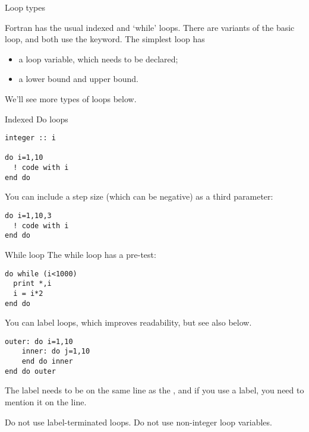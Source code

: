 
 {Loop types}

Fortran has the usual indexed and `while' loops. There are variants of the
basic loop, and both use the  keyword. The simplest loop has
\begin{itemize}
\item a loop variable, which needs to be declared;
\item a lower bound and upper bound.
\end{itemize}
We'll see more types of loops below.

\begin{block}{Indexed Do loops}
  \label{sl:doloop}
\begin{verbatim}
integer :: i

do i=1,10
  ! code with i
end do
\end{verbatim}

You can include a step size (which can be negative) as a third parameter:
\begin{verbatim}
do i=1,10,3
  ! code with i
end do
\end{verbatim}
\end{block}

\begin{block}{While loop}
  \label{sl:whilef}
  The while loop has a pre-test:
\begin{verbatim}
do while (i<1000)
  print *,i
  i = i*2
end do
\end{verbatim}
\end{block}

You can label loops, which improves readability, but see also below.
\begin{verbatim}
outer: do i=1,10
    inner: do j=1,10
    end do inner
end do outer
\end{verbatim}
The label needs to be on the same line as the , and if you use a
label, you need to mention it on the  line.

\begin{f77note}
  Do not use label-terminated loops. Do not use non-integer loop variables.
\end{f77note}

